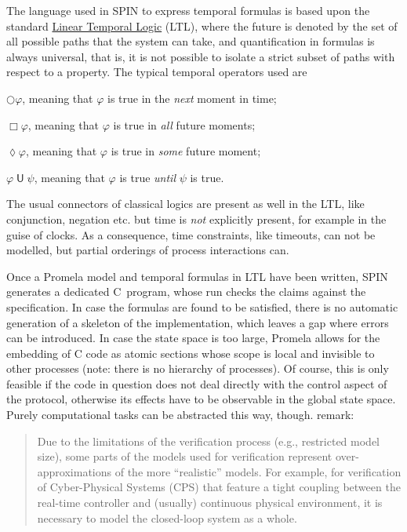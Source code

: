 \documentclass[a4paper,11pt,twoside]{article}
\newcommand\SPIN{\textsf{SPIN}\xspace}
\newcommand\Promela{\textsf{Promela}\xspace}
\newcommand\Clang{\textsf{C}\xspace}
\begin{document}
The language used in \SPIN to express temporal formulas is based upon
the standard
\href{http://en.wikipedia.org/wiki/Linear_temporal_logic}{Linear
  Temporal Logic} (LTL), where the future is denoted by the set of all
possible paths that the system can take, and quantification in
formulas is always universal, that is, it is not possible to isolate a
strict subset of paths with respect to a property. The typical
temporal operators used are
\begin{itemize*}

  \item $\bigcirc \varphi$, meaning that $\varphi$ is true in the
    \emph{next} moment in time;

  \item $\Box \varphi$, meaning that $\varphi$ is true in \emph{all}
    future moments;

  \item $\lozenge \varphi$, meaning that $\varphi$ is true in
    \emph{some} future moment;

  \item $\varphi \mathrel{\textsf{U}} \psi$, meaning that $\varphi$ is
    true \emph{until} $\psi$ is true.

\end{itemize*}
The usual connectors of classical logics are present as well in the
LTL, like conjunction, negation etc. but time is \emph{not} explicitly
present, for example in the guise of clocks. As a consequence, time
constraints, like timeouts, can not be modelled, but partial orderings
of process interactions can.

Once a \Promela model and temporal formulas in LTL have been written,
\SPIN generates a dedicated \Clang~program, whose run checks the
claims against the specification. In case the formulas are found to be
satisfied, there is no automatic generation of a skeleton of the
implementation, which leaves a gap where errors can be introduced. In
case the state space is too large, \Promela allows for the embedding
of \Clang code as atomic sections whose scope is local and invisible
to other processes (note: there is no hierarchy of processes). Of
course, this is only feasible if the code in question does not deal
directly with the control aspect of the protocol, otherwise its
effects have to be observable in the global state space. Purely
computational tasks can be abstracted this way,
though. \citet{PajicJiangLeeSokolskyMangharam:2012} remark: \blockquote{Due to the limitations of the verification
  process (e.g., restricted model size), some parts of the models used
  for verification represent over\hyp{}approximations of the more
  ``realistic'' models. For example, for verification of
  Cyber\hyp{}Physical Systems (CPS) that feature a tight coupling
  between the real\hyp{}time controller and (usually) continuous
  physical environment, it is necessary to model the closed-loop
  system as a whole.}
\end{document}
